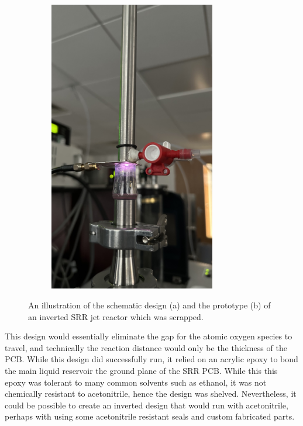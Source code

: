 \begin{figure}
\begin{subfigure}[b]{0.475\textwidth}
        \includegraphics[width=0.8\textwidth]{chapter_6/figures/upside_down_reactor_prototype.jpeg}
        \caption{}
        \label{fig:upside_down_reactor_prototype}
    \end{subfigure}

    \caption{\small An illustration of the schematic design (a) and the prototype (b) of an inverted SRR jet reactor which was scrapped.} 
    \label{fig:upside_down_reactor}
\end{figure}

This design would essentially eliminate the gap for the atomic oxygen species to travel, and technically the reaction distance would only be the thickness of the PCB. While this design did successfully run, it relied on an acrylic epoxy to bond the main liquid reservoir the ground plane of the SRR PCB. While this this epoxy was tolerant to many common solvents such as ethanol, it was not chemically resistant to acetonitrile, hence the design was shelved. Nevertheless, it could be possible to create an inverted design that would run with acetonitrile, perhaps with using some acetonitrile resistant seals and custom fabricated parts.



